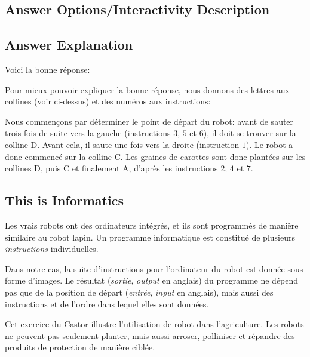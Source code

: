 \documentclass[a4paper,11pt]{report}
\newcommand{\taskGraphicsFolder}{..}
\begin{document}
\begingroup
\renewcommand{\arraystretch}{1.5}
\subsection*{Answer Options/Interactivity Description}



\endgroup

\subsection*{Answer Explanation}

Voici la bonne réponse: \raisebox{-0.5ex}{}

Pour mieux pouvoir expliquer la bonne réponse, nous donnons des lettres aux collines (voir ci-dessus) et des numéros aux instructions:

{\centering%
\par}

Nous commençons par déterminer le point de départ du robot: avant de sauter trois fois de suite vers la gauche (instructions $3$, $5$ et $6$), il doit se trouver sur la colline D. Avant cela, il saute une fois vers la droite (instruction $1$). Le robot a donc commencé sur la colline C. Les graines de carottes sont donc plantées sur les collines D, puis C et finalement A, d’après les instructions $2$, $4$ et $7$.


\subsection*{This is Informatics}

Les vrais robots ont des ordinateurs intégrés, et ils sont programmés de manière similaire au robot lapin. Un programme informatique est constitué de plusieurs \emph{instructions} individuelles.

Dans notre cas, la suite d’instructions pour l’ordinateur du robot est donnée sous forme d’images. Le résultat (\emph{sortie}, \emph{output} en anglais) du programme ne dépend pas que de la position de départ (\emph{entrée}, \emph{input} en anglais), mais aussi des instructions et de l’ordre dans lequel elles sont données.

Cet exercice du Castor illustre l’utilisation de robot dans l’agriculture. Les robots ne peuvent pas seulement planter, mais aussi arroser, polliniser et répandre des produits de protection de manière ciblée.
\end{document}
